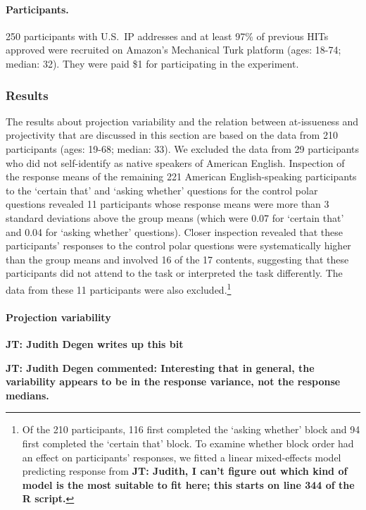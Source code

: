 \documentclass[11pt,fleqn]{article}
\newcommand{\6}{\mbox{$[\hspace*{-.6mm}[$}}
\newcommand{\9}{\mbox{$]\hspace*{-.6mm}]$}}
\newcommand{\jt}[1]{\textbf{\color{blue}JT: #1}}
\begin{document}
\paragraph{Participants.} 250 participants with U.S.\ IP addresses and at least 97\% of previous HITs approved were recruited on Amazon's Mechanical Turk platform (ages: 18-74; median: 32). They were paid \$1 for participating in the experiment. 


\subsubsection{Results}

The results about projection variability and the relation between at-issueness and projectivity that are discussed in this section are based on the data from 210 participants (ages: 19-68; median: 33). We excluded the data from 29 participants who did not self-identify as native speakers of American English. Inspection of the response means of the remaining 221 American English-speaking participants to the `certain that' and `asking whether' questions for the control polar questions revealed 11 participants whose response means were more than 3 standard deviations above the group means (which were 0.07 for `certain that' and 0.04 for `asking whether' questions). Closer inspection revealed that these participants' responses to the control polar questions were systematically higher than the group means and involved 16 of the 17 contents, suggesting that these participants did not attend to the task or interpreted the task differently. The data from these 11 participants were also excluded.\footnote{Of the 210 participants, 116 first completed the `asking whether' block and 94 first completed the `certain that' block. To examine whether block order had an effect on participants' responses, we fitted a linear mixed-effects model predicting response from \jt{Judith, I can't figure out which kind of model is the most suitable to fit here; this starts on line 344 of the R script.}}

\paragraph{Projection variability}

\jt{Judith Degen writes up this bit}

\jt{Judith Degen commented: Interesting that in general, the variability appears to be in the response variance, not the response medians.}
\end{document}
